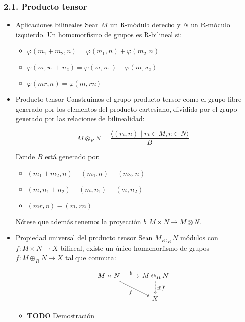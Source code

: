 \documentclass[11pt]{article}
\begin{document}
\subsubsection*{2.1. Producto tensor}
\label{sec-7-2-1}
\begin{itemize}
\item Aplicaciones bilineales
\label{sec-7-2-1-1}
Sean $M$ un R-módulo derecho y $N$ un R-módulo izquierdo. Un homomorfismo de
grupos es R-bilineal si:

\begin{itemize}
\item $\varphi(m_1+m_2,n) = \varphi(m_1,n) + \varphi(m_2,n)$
\item $\varphi(m,n_1+n_2) = \varphi(m,n_1) + \varphi(m,n_2)$
\item $\varphi(mr,n) = \varphi(m,rn)$
\end{itemize}

\item Producto tensor
\label{sec-7-2-1-2}
Construimos el grupo producto tensor como el grupo libre generado por
los elementos del producto cartesiano, dividido por el grupo generado 
por las relaciones de bilinealidad:

\[
M \otimes_R N = \frac{\langle
(m,n) \mid m \in M, n \in N
\rangle}{B}
\]

Donde $B$ está generado por:

\begin{itemize}
\item $(m_1+m_2,n) - (m_1,n) - (m_2,n)$
\item $(m,n_1+n_2) - (m,n_1) - (m,n_2)$
\item $(mr,n)-(m,rn)$
\end{itemize}

Nótese que además tenemos la proyección $b : M \times N \to M \otimes N$.

\item Propiedad universal del producto tensor
\label{sec-7-2-1-3}
Sean $M_R, _RN$ módulos con $f : M \times N \to X$ bilineal, existe un
único homomorfismo de grupos $\overline{f} : M \oplus_R N \to X$ tal que conmuta:

\[\begin{tikzcd}
M \times N \rar{b}\drar[swap]{f} & 
M \otimes_R N \dar[dashed]{\exists! \overline{f}} \\
& X
\end{tikzcd}\]

\begin{itemize}
\item {\bfseries\sffamily TODO} Demostración
\label{sec-7-2-1-3-1}
\end{itemize}


\end{itemize}
\end{document}

